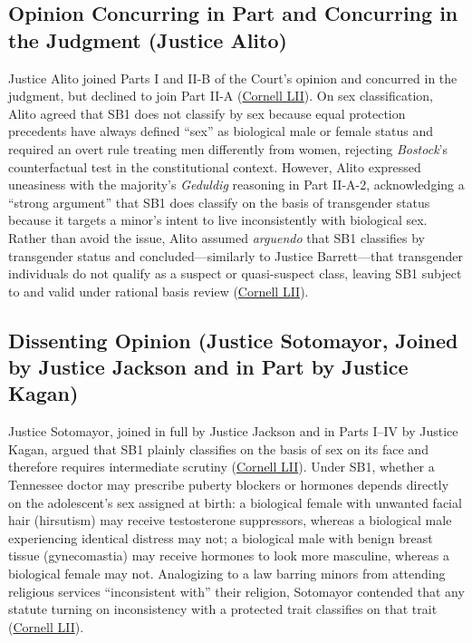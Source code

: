 \documentclass[12pt]{article}
\begin{document}
\subsection{Opinion Concurring in Part and Concurring in the Judgment (Justice Alito)}

Justice Alito joined Parts I and II-B of the Court's opinion and concurred in the judgment, but declined to join Part II-A (\href{https://www.law.cornell.edu/supremecourt/text/23-477}{Cornell LII}). On sex classification, Alito agreed that SB1 does not classify by sex because equal protection precedents have always defined ``sex'' as biological male or female status and required an overt rule treating men differently from women, rejecting \textit{Bostock}'s counterfactual test in the constitutional context. However, Alito expressed uneasiness with the majority's \textit{Geduldig} reasoning in Part II-A-2, acknowledging a ``strong argument'' that SB1 does classify on the basis of transgender status because it targets a minor's intent to live inconsistently with biological sex. Rather than avoid the issue, Alito assumed \textit{arguendo} that SB1 classifies by transgender status and concluded---similarly to Justice Barrett---that transgender individuals do not qualify as a suspect or quasi-suspect class, leaving SB1 subject to and valid under rational basis review (\href{https://www.law.cornell.edu/supremecourt/text/23-477}{Cornell LII}).

\subsection{Dissenting Opinion (Justice Sotomayor, Joined by Justice Jackson and in Part by Justice Kagan)}

Justice Sotomayor, joined in full by Justice Jackson and in Parts I--IV by Justice Kagan, argued that SB1 plainly classifies on the basis of sex on its face and therefore requires intermediate scrutiny (\href{https://www.law.cornell.edu/supremecourt/text/23-477}{Cornell LII}). Under SB1, whether a Tennessee doctor may prescribe puberty blockers or hormones depends directly on the adolescent's sex assigned at birth: a biological female with unwanted facial hair (hirsutism) may receive testosterone suppressors, whereas a biological male experiencing identical distress may not; a biological male with benign breast tissue (gynecomastia) may receive hormones to look more masculine, whereas a biological female may not. Analogizing to a law barring minors from attending religious services ``inconsistent with'' their religion, Sotomayor contended that any statute turning on inconsistency with a protected trait classifies on that trait (\href{https://www.law.cornell.edu/supremecourt/text/23-477}{Cornell LII}).
\end{document}
